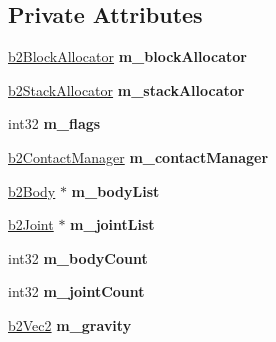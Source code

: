 \subsection*{Private Attributes}
\begin{DoxyCompactItemize}
\item 
\hyperlink{classb2_block_allocator}{b2\+Block\+Allocator} {\bfseries m\+\_\+block\+Allocator}\hypertarget{classb2_world_ab02b03963ed73501770f7a89c9186e72}{}\label{classb2_world_ab02b03963ed73501770f7a89c9186e72}

\item 
\hyperlink{classb2_stack_allocator}{b2\+Stack\+Allocator} {\bfseries m\+\_\+stack\+Allocator}\hypertarget{classb2_world_a9c56dd143340d0db681a7bb2f0c937e3}{}\label{classb2_world_a9c56dd143340d0db681a7bb2f0c937e3}

\item 
int32 {\bfseries m\+\_\+flags}\hypertarget{classb2_world_a1b5cd8c24bf3a900dca9a7acec207e60}{}\label{classb2_world_a1b5cd8c24bf3a900dca9a7acec207e60}

\item 
\hyperlink{classb2_contact_manager}{b2\+Contact\+Manager} {\bfseries m\+\_\+contact\+Manager}\hypertarget{classb2_world_adc5b9e56c3d3c84993901dda29341140}{}\label{classb2_world_adc5b9e56c3d3c84993901dda29341140}

\item 
\hyperlink{classb2_body}{b2\+Body} $\ast$ {\bfseries m\+\_\+body\+List}\hypertarget{classb2_world_acb01b9fe3ae8e3014883d2cd8da5534a}{}\label{classb2_world_acb01b9fe3ae8e3014883d2cd8da5534a}

\item 
\hyperlink{classb2_joint}{b2\+Joint} $\ast$ {\bfseries m\+\_\+joint\+List}\hypertarget{classb2_world_abe24b2f269cec46974c4331bd5418f41}{}\label{classb2_world_abe24b2f269cec46974c4331bd5418f41}

\item 
int32 {\bfseries m\+\_\+body\+Count}\hypertarget{classb2_world_aa24704aec207b3ae8359a2ffe6d01411}{}\label{classb2_world_aa24704aec207b3ae8359a2ffe6d01411}

\item 
int32 {\bfseries m\+\_\+joint\+Count}\hypertarget{classb2_world_a1f722f498830b3fcfc86792555f0f57f}{}\label{classb2_world_a1f722f498830b3fcfc86792555f0f57f}

\item 
\hyperlink{structb2_vec2}{b2\+Vec2} {\bfseries m\+\_\+gravity}\hypertarget{classb2_world_a3c8ec39b73bdec820e03b17ef1d18b28}{}\label{classb2_world_a3c8ec39b73bdec820e03b17ef1d18b28}


\end{DoxyCompactItemize}
